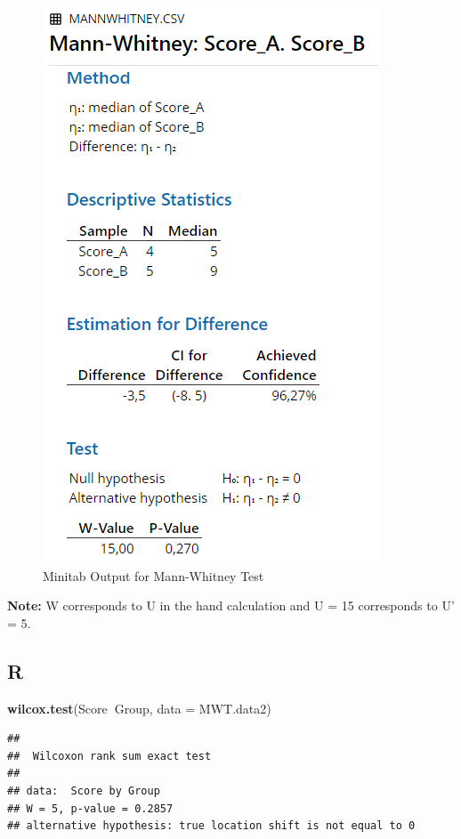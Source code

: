 \documentclass[
]{book}
\newenvironment{Shaded}{\begin{snugshade}}{\end{snugshade}}
\newcommand{\DataTypeTok}[1]{\textcolor[rgb]{0.13,0.29,0.53}{#1}}
\newcommand{\KeywordTok}[1]{\textcolor[rgb]{0.13,0.29,0.53}{\textbf{#1}}}
\newcommand{\NormalTok}[1]{#1}
\newcommand{\OperatorTok}[1]{\textcolor[rgb]{0.81,0.36,0.00}{\textbf{#1}}}
\begin{document}
\begin{figure}[!h]
\includegraphics{Screenshots/Mann WHitney/mwtMinitab} \caption{\label{fig:mwtMinitab}Minitab Output for Mann-Whitney Test}\label{fig:mwtMinitab}
\end{figure}

\textbf{Note:} W corresponds to U in the hand calculation and U = 15 corresponds to U' = 5.

\hypertarget{r-1}{%
\subsection{R}\label{r-1}}

\begin{Shaded}
\begin{Highlighting}[]
\KeywordTok{wilcox.test}\NormalTok{(Score}\OperatorTok{~}\NormalTok{Group, }\DataTypeTok{data =}\NormalTok{ MWT.data2)}
\end{Highlighting}
\end{Shaded}

\begin{verbatim}
## 
## 	Wilcoxon rank sum exact test
## 
## data:  Score by Group
## W = 5, p-value = 0.2857
## alternative hypothesis: true location shift is not equal to 0
\end{verbatim}
\end{document}
